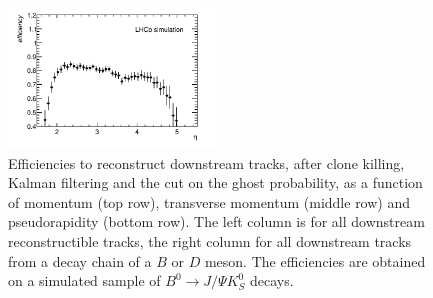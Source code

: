 \begin{figure}[tbph]
\begin{center}
\includegraphics[width = 0.49\textwidth]{figures/EffPatLLT/overall/BJpsiKSFromBDEta_TBTC.png}
\caption{Efficiencies to reconstruct downstream tracks, after clone killing,
Kalman filtering and the cut on the ghost probability, as a function of momentum
(top row), transverse momentum (middle row) and pseudorapidity (bottom row). The
left column is for all downstream reconstructible tracks, the right column for
all downstream tracks from a decay chain of a $B$ or $D$ meson. The efficiencies are
obtained on a simulated sample of  $B^{0} \rightarrow J/\Psi K^{0}_{S}$ decays.}
\label{fig:EffPatLLTBJpsiK_TBTC}
 \end{center}
 \end{figure}

